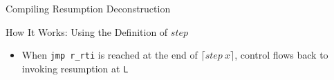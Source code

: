 \documentclass{beamer}
\begin{document}
\begin{frame}{Compiling Resumption Deconstruction}
\begin{structure}{How It Works: Using the Definition of $step$}
\begin{itemize}
\begin{itemize}
\item{\scriptsize{\texttt{PAUSE\_HEADER} is a fixed-size offset determined by the footprint of the initial assignment to \texttt{r\_rti}}}
\end{itemize}

\item{When \texttt{jmp r\_rti} is reached at the end of $\lceil step\ x\rceil$, control flows back to invoking resumption at \texttt{L}}

\end{itemize}

\end{structure}

\end{frame}


\end{document}

